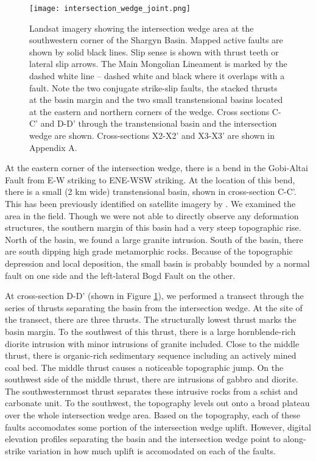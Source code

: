 \begin{figure}[ht!]
  \centering
  \texttt{[image: intersection\_wedge\_joint.png]}
  \caption{Landsat imagery showing the intersection wedge area at the southwestern corner of the Shargyn Basin. Mapped active faults are shown by solid black lines. Slip sense is shown with thrust teeth or lateral slip arrows. The Main Mongolian Lineament is marked by the dashed white line -- dashed white and black where it overlaps with a fault. Note the two conjugate strike-slip faults, the stacked thrusts at the basin margin and the two small transtensional basins located at the eastern and northern corners of the wedge. Cross sections C-C' and D-D' through the transtensional basin and the intersection wedge are shown. Cross-sections X2-X2' and X3-X3' are shown in Appendix A.}
  \label{intersection_wedge_joint}
\end{figure}

At the eastern corner of the intersection wedge, there is a bend in the Gobi-Altai Fault from E-W striking to ENE-WSW striking. At the location of this bend, there is a small (2 km wide) transtensional basin, shown in cross-section C-C'. This has been previously identified on satellite imagery by \citet{Cunningham2010}. We examined the area in the field. Though we were not able to directly observe any deformation structures, the southern margin of this basin had a very steep topographic rise. North of the basin, we found a large granite intrusion. South of the basin, there are south dipping high grade metamorphic rocks. Because of the topographic depression and local deposition, the small basin is probably bounded by a normal fault on one side and the left-lateral Bogd Fault on the other. 

At cross-section D-D' (shown in Figure \ref{intersection_wedge_joint}), we performed a transect through the series of thrusts separating the basin from the intersection wedge. At the site of the transect, there are three thrusts. The structurally lowest thrust marks the basin margin. To the southwest of this thrust, there is a large hornblende-rich diorite intrusion with minor intrusions of granite included. Close to the middle thrust, there is organic-rich sedimentary sequence including an actively mined coal bed. The middle thrust causes a noticeable topographic jump. On the southwest side of the middle thrust, there are intrusions of gabbro and diorite. The southwesternmost thrust separates these intrusive rocks from a schist and carbonate unit. To the southwest, the topography levels out onto a broad plateau over the whole intersection wedge area. Based on the topography, each of these faults accomodates some portion of the intersection wedge uplift. However, digital elevation profiles separating the basin and the intersection wedge point to along-strike variation in how much uplift is accomodated on each of the faults. 

